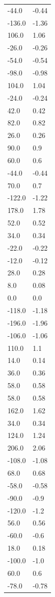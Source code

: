 \begin{longtable}{ll}
-44.0 & -0.44 \\
-136.0 & -1.36 \\
106.0 & 1.06 \\
-26.0 & -0.26 \\
-54.0 & -0.54 \\
-98.0 & -0.98 \\
104.0 & 1.04 \\
-24.0 & -0.24 \\
42.0 & 0.42 \\
82.0 & 0.82 \\
26.0 & 0.26 \\
90.0 & 0.9 \\
60.0 & 0.6 \\
-44.0 & -0.44 \\
70.0 & 0.7 \\
-122.0 & -1.22 \\
178.0 & 1.78 \\
52.0 & 0.52 \\
34.0 & 0.34 \\
-22.0 & -0.22 \\
-12.0 & -0.12 \\
28.0 & 0.28 \\
8.0 & 0.08 \\
0.0 & 0.0 \\
-118.0 & -1.18 \\
-196.0 & -1.96 \\
-106.0 & -1.06 \\
110.0 & 1.1 \\
14.0 & 0.14 \\
36.0 & 0.36 \\
58.0 & 0.58 \\
58.0 & 0.58 \\
162.0 & 1.62 \\
34.0 & 0.34 \\
124.0 & 1.24 \\
206.0 & 2.06 \\
-108.0 & -1.08 \\
68.0 & 0.68 \\
-58.0 & -0.58 \\
-90.0 & -0.9 \\
-120.0 & -1.2 \\
56.0 & 0.56 \\
-60.0 & -0.6 \\
18.0 & 0.18 \\
-100.0 & -1.0 \\
60.0 & 0.6 \\
-78.0 & -0.78 \\

\end{longtable}
